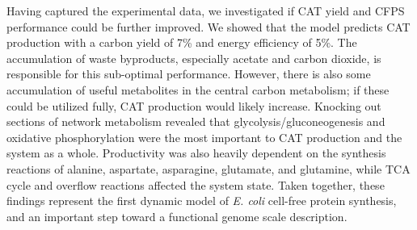 \documentclass[12pt]{article}
\begin{document}
Having captured the experimental data, we investigated if CAT yield and CFPS performance could be further improved.
We showed that the model predicts CAT production with a carbon yield of 7\% and energy efficiency of 5\%.
The accumulation of waste byproducts, especially acetate and carbon dioxide, is responsible for this sub-optimal performance.
However, there is also some accumulation of useful metabolites in the central carbon metabolism; if these could be utilized fully, CAT production would likely increase.
Knocking out sections of network metabolism revealed that glycolysis/gluconeogenesis and oxidative phosphorylation were the most important to CAT production and the system as a whole.
Productivity was also heavily dependent on the synthesis reactions of alanine, aspartate, asparagine, glutamate, and glutamine, while TCA cycle and overflow reactions affected the system state.
Taken together, these findings represent the first dynamic model of \textit{E. coli} cell-free protein synthesis, and an important step toward a functional genome scale description.
\end{document}
